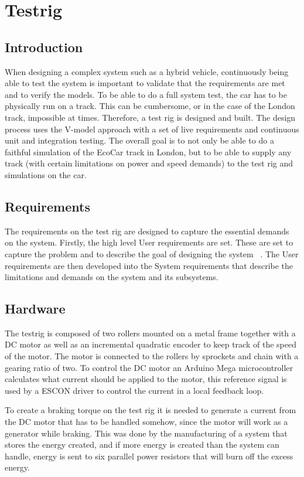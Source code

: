 \chapter{Testrig}
\section{Introduction}
When designing a complex system such as a hybrid vehicle, continuously being
able to test the system is important to validate that the requirements are met
and to verify the models. To be able to do a full system test, the car has to be
physically run on a track. This can be cumbersome, or in the case of the London
track, impossible at times. Therefore, a test rig is designed and built. The
design process uses the V-model approach with a set of live requirements and
continuous unit and integration testing. The overall goal is to not only be able
to do a faithful simulation of the EcoCar track in London, but to be able to
supply any track (with certain limitations on power and speed demands) to the
test rig and simulations on the car.

\section{Requirements}
The requirements on the test rig are designed to capture the essential demands
on the system. Firstly, the high level User requirements are set. These are set
to capture the problem and to describe the goal of designing the system
~\cite{ibm_req}. The User requirements are then developed into the System
requirements that describe the limitations and demands on the system and its
subsystems.

\section{Hardware}
The testrig is composed of two rollers mounted on a metal frame together with a DC motor as well as an incremental quadratic encoder to keep track of the speed of the motor. The motor is connected to the rollers by sprockets and chain with a gearing ratio of two. To control the DC motor an Arduino Mega microcontroller calculates what current should be applied to the motor, this reference signal is used by a ESCON driver to control the current in a local feedback loop.

To create a braking torque on the test rig it is needed to generate a current from the DC motor that has to be handled somehow, since the motor will work as a generator while braking. This was done by the manufacturing of a system that stores the energy created, and if more energy is created than the system can handle, energy is sent to six parallel power resistors that will burn off the excess energy. 

